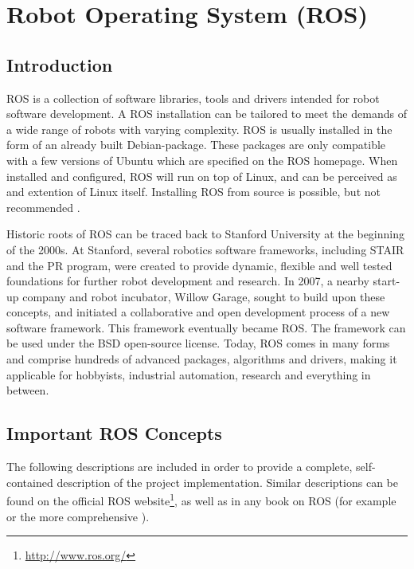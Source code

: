 \section{Robot Operating System (ROS)}
\label{sec:ros}
\subsection{Introduction}

\ac{ROS} is a collection of software libraries, tools and drivers intended for robot software development. A \ac{ROS} installation can be tailored to meet the demands of a wide range of robots with varying complexity. \ac{ROS} is usually installed in the form of an already built Debian-package. These packages are only compatible with a few versions of Ubuntu which are specified on the \ac{ROS} homepage. When installed and configured, \ac{ROS} will run on top of Linux, and can be perceived as and extention of Linux itself. Installing \ac{ROS} from source is possible, but not recommended \cite{ROS_install}.

Historic roots of \ac{ROS} can be traced back to Stanford University at the beginning of the 2000s. At Stanford, several robotics software frameworks, including \ac{STAIR} and the \ac{PR} program, were created to provide dynamic, flexible and well tested foundations for further robot development and research. In 2007, a nearby start-up company and robot incubator, Willow Garage, sought to build upon these concepts, and initiated a collaborative and open development process of a new software framework. This framework eventually became \ac{ROS}\cite{ROS_history}\cite{rosbook15}. The framework can be used under the BSD open-source license\cite{BCD_license}. Today, \ac{ROS} comes in many forms and comprise hundreds of advanced packages, algorithms and drivers, making it applicable for hobbyists, industrial automation, research and everything in between. 

\subsection{Important ROS Concepts}
\label{sec:ros_concepts}
The following descriptions are included in order to provide a complete, self-contained description of the project implementation. Similar descriptions can be found on the official \ac{ROS} website\footnote{\url{http://www.ros.org/}}, as well as in any book on \ac{ROS} (for example \cite{rosbook15} or the more comprehensive \cite{koubaa2016robot}). 

